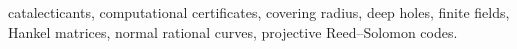 catalecticants, computational certificates, covering radius, deep holes,
finite fields, Hankel matrices, normal rational curves,
projective Reed--Solomon codes.
